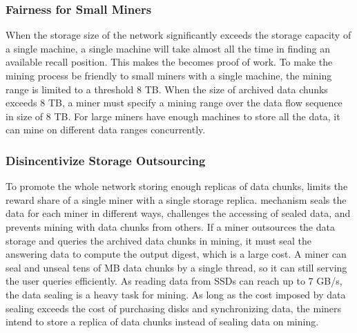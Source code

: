 
\subsubsection{Fairness for Small Miners}

When the storage size of the {\project} network significantly exceeds the storage capacity of a single machine, a single machine will take almost all the time in finding an available recall position. 
%
This makes the {\sproof} becomes proof of work. 
%
To make the {\sproof} mining process be friendly to small miners with a single machine, the mining range is limited to a threshold 8 TB. 
%
When the size of archived data chunks exceeds 8 TB, a miner must specify a mining range over the data flow sequence in size of 8 TB.
%
For large miners have enough machines to store all the data, it can mine on different data ranges concurrently. 

\subsubsection{Disincentivize Storage Outsourcing}

To promote the whole network storing enough replicas of data chunks, {\project} limits the reward share of a single miner with a single storage replica.
%
{\sproof} mechanism seals the data for each miner in different ways, challenges the accessing of sealed data, and prevents mining with data chunks from others. 
% 
If a miner outsources the data storage and queries the archived data chunks in {\sproof} mining, it must seal the answering data to compute the output digest, which is a large cost.
%
A miner can seal and unseal tens of MB data chunks by a single thread, so it can still serving the user queries efficiently. 
%
As reading data from SSDs can reach up to 7 GB/s, the data sealing is a heavy task for {\sproof} mining.
%
As long as the cost imposed by data sealing exceeds the cost of purchasing disks and synchronizing data, the miners intend to store a replica of data chunks instead of sealing data on {\sproof} mining.

